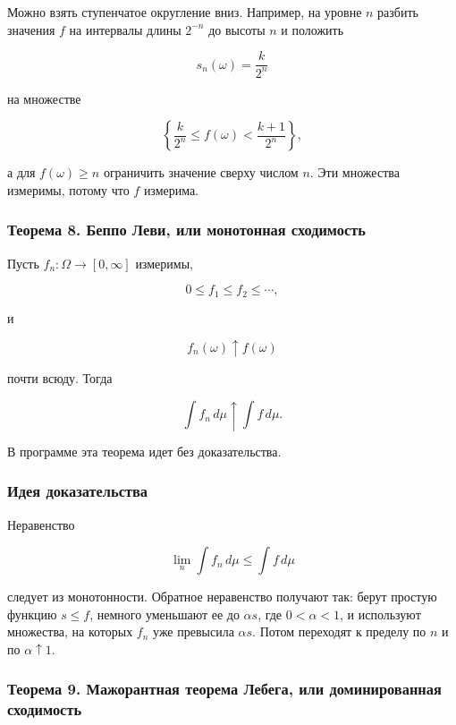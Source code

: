 \documentclass[
  11pt,
  a4paper,
]{article}
\begin{document}
Можно взять ступенчатое округление вниз. Например, на уровне \(n\)
разбить значения \(f\) на интервалы длины \(2^{-n}\) до высоты \(n\) и
положить

\[
s_n(\omega)=\frac{k}{2^n}
\]

на множестве

\[
\left\{\frac{k}{2^n}\le f(\omega)<\frac{k+1}{2^n}\right\},
\]

а для \(f(\omega)\ge n\) ограничить значение сверху числом \(n\). Эти
множества измеримы, потому что \(f\) измерима.

\subsubsection{Теорема 8. Беппо Леви, или монотонная
сходимость}\label{ux442ux435ux43eux440ux435ux43cux430-8.-ux431ux435ux43fux43fux43e-ux43bux435ux432ux438-ux438ux43bux438-ux43cux43eux43dux43eux442ux43eux43dux43dux430ux44f-ux441ux445ux43eux434ux438ux43cux43eux441ux442ux44c}

Пусть \(f_n:\Omega\to[0,\infty]\) измеримы,

\[
0\le f_1\le f_2\le\cdots,
\]

и

\[
f_n(\omega)\uparrow f(\omega)
\]

почти всюду. Тогда

\[
\int f_n\,d\mu\uparrow\int f\,d\mu.
\]

В программе эта теорема идет без доказательства.

\subsubsection{Идея
доказательства}\label{ux438ux434ux435ux44f-ux434ux43eux43aux430ux437ux430ux442ux435ux43bux44cux441ux442ux432ux430}

Неравенство

\[
\lim_n\int f_n\,d\mu\le\int f\,d\mu
\]

следует из монотонности. Обратное неравенство получают так: берут
простую функцию \(s\le f\), немного уменьшают ее до \(\alpha s\), где
\(0<\alpha<1\), и используют множества, на которых \(f_n\) уже превысила
\(\alpha s\). Потом переходят к пределу по \(n\) и по
\(\alpha\uparrow1\).

\subsubsection{Теорема 9. Мажорантная теорема Лебега, или доминированная
сходимость}\label{ux442ux435ux43eux440ux435ux43cux430-9.-ux43cux430ux436ux43eux440ux430ux43dux442ux43dux430ux44f-ux442ux435ux43eux440ux435ux43cux430-ux43bux435ux431ux435ux433ux430-ux438ux43bux438-ux434ux43eux43cux438ux43dux438ux440ux43eux432ux430ux43dux43dux430ux44f-ux441ux445ux43eux434ux438ux43cux43eux441ux442ux44c}
\end{document}
